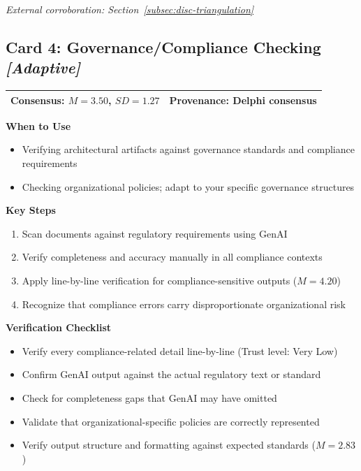 \vspace{0.5em}
\textit{External corroboration: Section~\ref{subsec:disc-triangulation}}

\clearpage
\subsection*{Card 4: Governance/Compliance Checking \hfill \textit{[Adaptive]}}

\begin{tabular}{|p{7cm}|p{6cm}|}
    \hline
    \textbf{Consensus:} $M = 3.50$, $SD = 1.27$ & \textbf{Provenance:} Delphi consensus \\
    \hline
\end{tabular}

\vspace{0.5em}
\textbf{When to Use}
\begin{itemize}
    \item Verifying architectural artifacts against governance standards and compliance requirements
    \item Checking organizational policies; adapt to your specific governance structures
\end{itemize}

\textbf{Key Steps}
\begin{enumerate}
    \item Scan documents against regulatory requirements using GenAI
    \item Verify completeness and accuracy manually in all compliance contexts
    \item Apply line-by-line verification for compliance-sensitive outputs ($M = 4.20$)
    \item Recognize that compliance errors carry disproportionate organizational risk
\end{enumerate}

\textbf{Verification Checklist}
\begin{itemize}[label=\checkbox]
    \item Verify every compliance-related detail line-by-line (Trust level: Very Low)
    \item Confirm GenAI output against the actual regulatory text or standard
    \item Check for completeness gaps that GenAI may have omitted
    \item Validate that organizational-specific policies are correctly represented
    \item Verify output structure and formatting against expected standards ($M = 2.83$)
\end{itemize}

